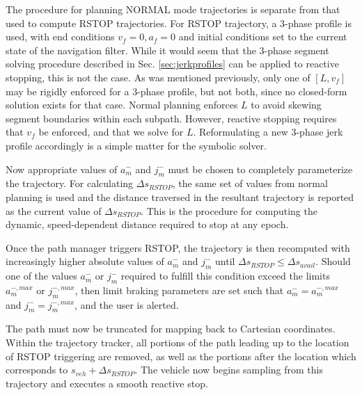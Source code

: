\documentclass[letterpaper, 10 pt, conference]{ieeeconf}  %
\begin{document}
The procedure for planning NORMAL mode trajectories is separate from that used to compute RSTOP trajectories.
For RSTOP trajectory, a 3-phase profile is used, with end conditions $v_f=0, a_f=0$ and initial conditions set to the current state of the navigation filter.
While it would seem that the 3-phase segment solving procedure described in Sec. 
\ref{sec:jerkprofiles} can be applied to reactive stopping, this is not the case.
As was mentioned previously, only one of $[L, v_f]$ may be rigidly enforced for a 3-phase profile, but not both, since no closed-form solution exists for that case.
Normal planning enforces $L$ to avoid skewing segment boundaries within each subpath.
However, reactive stopping requires that $v_f$ be enforced, and that we solve for $L$.
Reformulating a new 3-phase jerk profile accordingly is a simple matter for the symbolic solver.

Now appropriate values of $a_m^-$ and $j_m^-$ must be chosen to completely parameterize the trajectory.
For calculating $\Delta s_{RSTOP}$, the same set of values from normal planning is used and the distance traversed in the resultant trajectory is reported as the current value of $\Delta s_{RSTOP}$. This is the procedure for computing the dynamic, speed-dependent distance required to stop at any epoch.

Once the path manager triggers RSTOP, the trajectory is then recomputed with increasingly higher absolute values of $a_m^-$ and $j_m^-$ until $\Delta s_{RSTOP} \leqslant \Delta s_{avail}$.
Should one of the values $a_m^-$ or $j_m^-$ required to fulfill this condition exceed the limits $a_m^{-,max}$ or $j_m^{-,max}$, then limit braking parameters are set such that $a_m^-=a_m^{-,max}$ and $j_m^-=j_m^{-,max}$, and the user is alerted.

The path must now be truncated for mapping back to Cartesian coordinates.
Within the trajectory tracker, all portions of the path leading up to the location of RSTOP triggering are removed, as well as the portions after the location which corresponds to $s_{veh} + \Delta s_{RSTOP}$.
The vehicle now begins sampling from this trajectory and executes a smooth reactive stop.
\end{document}
